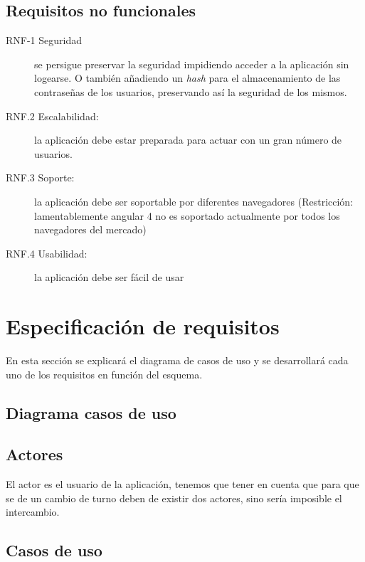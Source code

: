 \subsection{Requisitos no funcionales}\label{rnofuncionales}
\begin{description}
    \item [RNF-1 Seguridad] se persigue preservar la seguridad impidiendo acceder a la aplicación sin logearse. O también añadiendo un \emph{hash} para el almacenamiento de las contraseñas de los usuarios, preservando así la seguridad de los mismos.
    \item [RNF.2 Escalabilidad:] la aplicación debe estar preparada para actuar con un gran número de usuarios.
    \item [RNF.3 Soporte:]  la aplicación debe ser soportable por diferentes navegadores (Restricción: lamentablemente angular 4 no es soportado actualmente por todos los navegadores del mercado)
    \item [RNF.4 Usabilidad:]  la aplicación debe ser fácil de usar 
\end{description}


\section{Especificación de requisitos}\label{requisitos}

En esta sección se explicará el diagrama de casos de uso y se desarrollará cada uno de los requisitos en función del esquema.

\subsection{Diagrama casos de uso}


\subsection{Actores}
El actor es el usuario de la aplicación, tenemos que tener en cuenta que para que se de un cambio de turno deben de existir dos actores, sino sería imposible el intercambio.

\subsection{Casos de uso}

